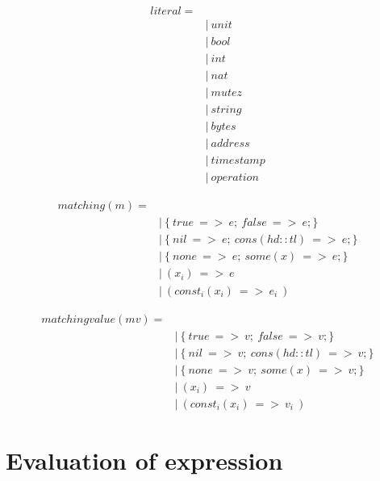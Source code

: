 \documentclass[10pt,a4paper]{article}
\begin{document}
\begin{align*}
literal =
\\
 \ &|\ unit    \ \tag{}
\\
 \ &|\ bool    \ \tag{}
\\
 \ &|\ int    \ \tag{}
\\
 \ &|\ nat    \ \tag{}
\\
 \ &|\ mutez    \ \tag{}
\\
 \ &|\ string    \ \tag{}
\\
 \ &|\ bytes    \ \tag{}
\\
 \ &|\ address    \ \tag{}
\\
 \ &|\ timestamp    \ \tag{}
\\
 \ &|\ operation    \ \tag{}
\end{align*}
 
\begin{align*}
matching(m) = 
\\
 \ &|\ \{\ true\ =>\ e;\ false\ =>\ e;\}       \ \tag{match\ bool}
\\
 \ &|\ \{\ nil \ =>\ e;\ cons(hd::tl)\ =>\ e;\}\ \tag{match\ list}
\\
 \ &|\ \{\ none\ =>\ e;\ some(x) \ =>\ e;\}    \ \tag{match\ option}
\\
 \ &|\ (x_i) \ =>\ e                     \ \tag{match\ tuple}
\\
 \ &|\ (const_i(x_i)\ =>\ e_i\ )          \ \tag{match\ variant}
\end{align*}

\begin{align*}
matching value (mv) = 
\\
 \ &|\ \{\ true\ =>\ v;\ false\ =>\ v;\}       \ \tag{match\ bool\ value}
\\
 \ &|\ \{\ nil \ =>\ v;\ cons(hd::tl)\ =>\ v;\}\ \tag{match\ list\ value}
\\
 \ &|\ \{\ none\ =>\ v;\ some(x) \ =>\ v;\}    \ \tag{match\ option\ value}
\\
 \ &|\ (x_i) \ =>\ v                     \ \tag{match\ tuple\ value}
\\
 \ &|\ (const_i(x_i)\ =>\ v_i\ )          \ \tag{match\ variant\ value}
\end{align*}


\section*{ Evaluation of expression }
\end{document}
